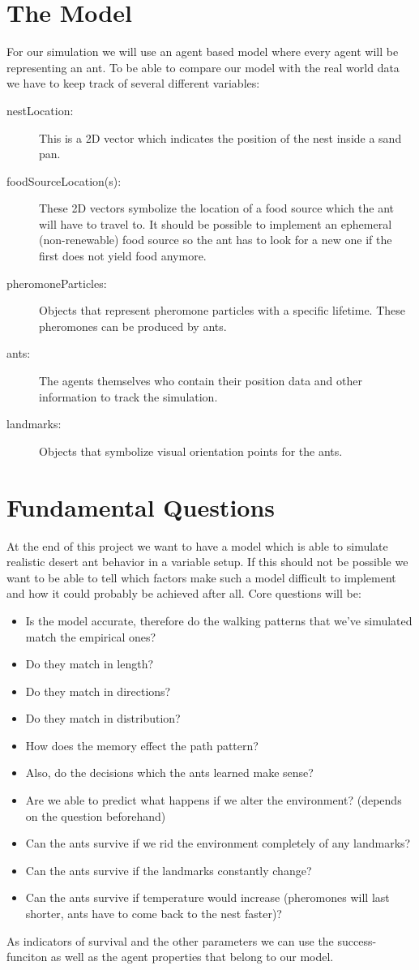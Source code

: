 \documentclass[11pt,a4paper]{scrartcl}
\begin{document}
\section*{The Model}
For our simulation we will use an agent based model where every agent will be representing an ant. To be able to compare our model with the real world data we have to keep track of several different variables:
\begin{description}
\item[nestLocation:] This is a 2D vector which indicates the position of the nest inside a sand pan.
\item[foodSourceLocation(s): ]These 2D vectors symbolize the location of a food source which the ant will have to travel to. It should be possible to implement an ephemeral (non-renewable) food source so the ant has to look for a new one if the first does not yield food anymore.
\item[pheromoneParticles: ]Objects that represent pheromone particles with a specific lifetime. These pheromones can be produced by ants.
\item [ants: ]The agents themselves who contain their position data and other information to track the simulation.
\item[landmarks:]Objects that symbolize visual orientation points for the ants.
\end{description}
 
\section*{Fundamental Questions}
At the end of this project we want to have a model which is able to simulate realistic desert ant behavior in a variable setup. If this should not be possible we want to be able to tell which factors make such a model difficult to implement and how it could probably be achieved after all.
Core questions will be:
\begin{itemize}
\item Is the model accurate, therefore do the walking patterns that we've simulated match the empirical ones?
\item Do they match in length?
\item Do they match in directions?
\item Do they match in distribution?
\item How does the memory effect the path pattern?
\item Also, do the decisions which the ants learned make sense?
\item Are we able to predict what happens if we alter the environment? (depends on the question beforehand)
\item Can the ants survive if we rid the environment completely of any landmarks?
\item Can the ants survive if the landmarks constantly change?
\item Can the ants survive if temperature would increase (pheromones will last shorter, ants have to come back to the nest faster)? 
\end{itemize}
As indicators of survival and the other parameters we can use the success-funciton as well as the agent properties that belong to our model.
\end{document}
